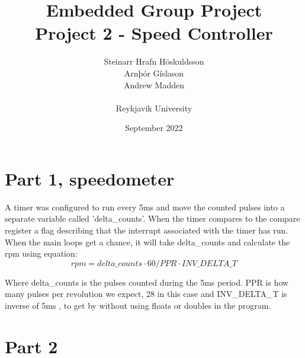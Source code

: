 \documentclass{article}
\title{Embedded Group Project\\ \large Project 2 - Speed Controller}
\author{Steinarr Hrafn Höskuldsson\\
Arnþór Gíslason\\
Andrew Madden\\
\\
Reykjavik University}
\date{September 2022}
\newcommand{\mycomment}[1]{}
\newcommand{\timerinterval}{5ms }
\begin{document}
\maketitle
\mycomment{
\begin{figure}[h]
    \centering
    \texttt{[image: LAB3/Basic1.png]}
    \caption{"Switch test" Breadboard set up}
    \label{fig:Switch_test}
\end{figure}



}

\section{Part 1, speedometer}
A timer was configured to run every \timerinterval and move the counted pulses into a separate variable called 'delta\_counts'. When the timer compares to the compare register a flag describing that the interrupt associated with the timer has run. 
When the main loops get a chance, it will take delta\_counts and calculate the rpm using equation: 
\begin{equation}
     rpm = delta\_counts \cdot 60 / PPR \cdot INV\_DELTA\_T
\end{equation}

Where delta\_counts is the pulses counted during the \timerinterval period. PPR is how many pulses per revolution we expect, 28 in this case and INV\_DELTA\_T is inverse of \timerinterval, to get by without using floats or doubles in the program.

\subsection{}

\section{Part 2}
\end{document}
